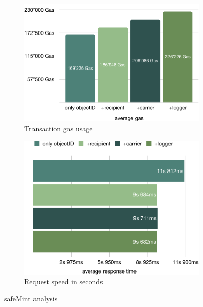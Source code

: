 \begin{figure}[ht]
    \begin{subfigure}{0.49\textwidth}
        \includegraphics[width=\textwidth]{diagrams/safeMint_gas_eval.pdf}
        \caption{Transaction gas usage}
        \label{fig:safemint_tx_cost}
    \end{subfigure}
    \hfill
    \begin{subfigure}{0.49\textwidth}
        \includegraphics[width=\textwidth]{diagrams/safeMint_request_time_eval.pdf}
        \caption{Request speed in seconds}
        \label{fig:safemint_tx_speed}
    \end{subfigure}
    \caption{safeMint analysis}
    \label{fig:safemint_analysis}
\end{figure}

